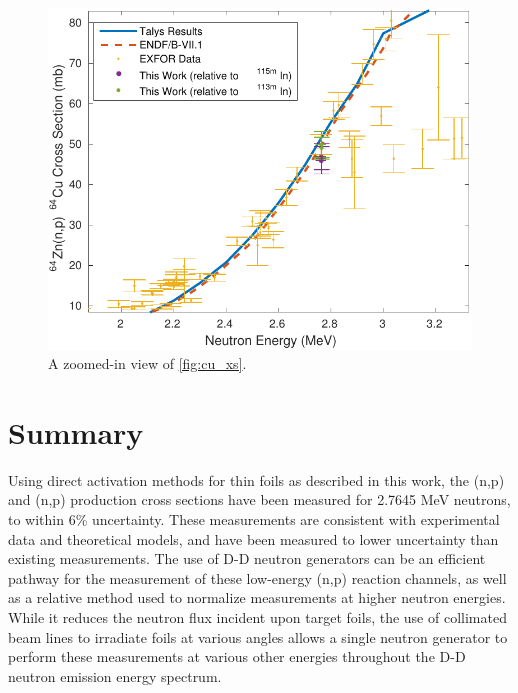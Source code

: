 \documentclass[5p]{elsarticle}
\begin{document}
\begin{figure}
 \centering
 \includegraphics[scale=0.6]{./figures/64cu_fixed_zoom.pdf}
 \caption{A zoomed-in view of \autoref{fig:cu_xs}.}
 \label{fig:cu_xs_zoom}
\end{figure}





          
\section{Summary}

Using direct activation methods for thin foils as described in this work, the (n,p) and (n,p) production cross sections have been measured for  2.7645 MeV neutrons, to within 6\% uncertainty. These measurements are consistent with experimental data and theoretical models,  and have been measured to lower uncertainty than existing measurements. The use of D-D neutron generators can be an efficient pathway for the measurement of these low-energy (n,p) reaction channels, as well as a relative method used to normalize measurements at higher neutron energies. While it reduces the neutron flux incident upon target foils, the use of collimated beam lines to irradiate foils at various angles allows a single neutron generator to perform these measurements at various other energies throughout the D-D neutron emission energy spectrum. 
\end{document}
